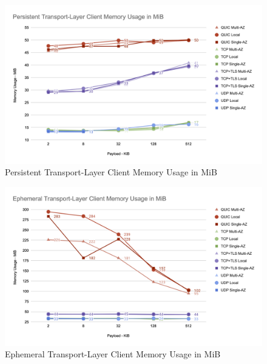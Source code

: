 \begin{figure}[h!]
    \centering
    \includegraphics[width=\linewidth]{figures/charts/Persistent Transport-Layer Client Memory Usage in MiB.png}
    \caption{Persistent Transport-Layer Client Memory Usage in MiB}
    \label{fig:persistent_client_transport_memory}
\end{figure}

\begin{figure}[h!]
    \centering
    \includegraphics[width=\linewidth]{figures/charts/Ephemeral Transport-Layer Client Memory Usage in MiB.png}
    \caption{Ephemeral Transport-Layer Client Memory Usage in MiB}
    \label{fig:ephemeral_client_transport_memory}
\end{figure}

\clearpage

